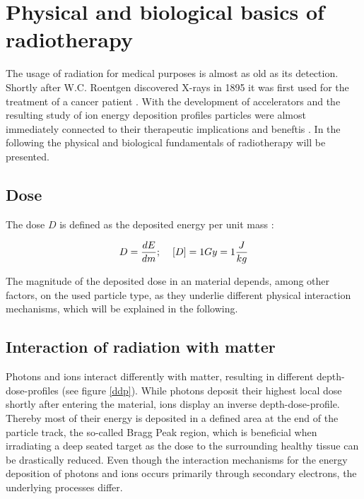 \documentclass[type=dr, dr=rernat, accentcolor=tud7b,colorbacktitle, bigchapter, openright, twoside, 12pt ]{tudthesis}
\begin{document}
\section{Physical and biological basics of radiotherapy}
\label{pbb}
The usage of radiation for medical purposes is almost as old as its detection. Shortly after W.C. Roentgen discovered X-rays in 1895 it 
was first used for the treatment of a cancer patient \cite{Hal06}. With the development of accelerators and the resulting study of ion 
energy deposition profiles particles were almost immediately connected to their therapeutic implications and beneftis 
\cite{Wil46}. In the following the physical and biological fundamentals of radiotherapy will be presented.


\subsection{Dose}

The dose $D$ is defined as the deposited energy per unit mass \cite{ICRU93}:

\begin{equation}
 D = \frac{dE}{dm} ; \hspace{0.4cm} [D]= 1 Gy = 1 \frac{J}{kg}
 \label{dose}
\end{equation}

The magnitude of the deposited dose in an material depends, among other factors, on the used particle type, as they underlie different 
physical interaction mechanisms, which will be explained in the following. 


\subsection{Interaction of radiation with matter}

Photons and ions interact differently with matter, resulting in different depth-dose-profiles (see figure \ref{ddp}). While photons deposit 
their highest local dose shortly after entering the material, ions display an inverse depth-dose-profile. Thereby most of their energy 
is deposited in a defined area at the end of the particle track, the so-called Bragg Peak region, which is beneficial when irradiating a 
deep seated target as the dose to the surrounding healthy tissue can be drastically reduced. Even though the interaction 
mechanisms for the energy deposition of photons and ions occurs primarily through secondary electrons, the underlying processes 
differ.

\newpage
 
\end{document}
